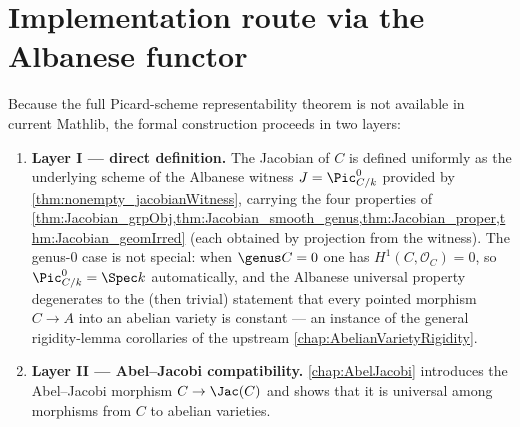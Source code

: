 \section{Implementation route via the Albanese functor}
Because the full Picard-scheme representability theorem is not available in current Mathlib, the formal construction proceeds in two layers:
\begin{enumerate}
  \item \textbf{Layer I --- direct definition.} The Jacobian of \(C\) is defined uniformly as the underlying scheme of the Albanese witness \(J = \Pic^0_{C/k}\) provided by \cref{thm:nonempty_jacobianWitness}, carrying the four properties of \cref{thm:Jacobian_grpObj,thm:Jacobian_smooth_genus,thm:Jacobian_proper,thm:Jacobian_geomIrred} (each obtained by projection from the witness). The genus-\(0\) case is not special: when \(\genus C = 0\) one has \(H^1(C, \mathcal O_C) = 0\), so \(\Pic^0_{C/k} = \Spec k\) automatically, and the Albanese universal property degenerates to the (then trivial) statement that every pointed morphism \(C \to A\) into an abelian variety is constant --- an instance of the general rigidity-lemma corollaries of the upstream \cref{chap:AbelianVarietyRigidity}.
  \item \textbf{Layer II --- Abel--Jacobi compatibility.} \cref{chap:AbelJacobi} introduces the Abel--Jacobi morphism \(C \to \Jac(C)\) and shows that it is universal among morphisms from \(C\) to abelian varieties.
\end{enumerate}
